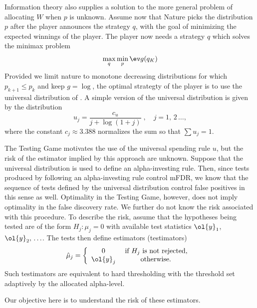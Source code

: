 \documentclass[12pt]{article}
\begin{document}
 Information theory also supplies a solution to the more general problem of
 allocating $W$ when $p$ is unknown.  Assume now that Nature picks the
 distribution $p$ after the player announces the strategy $q$, with the goal of
 minimizing the expected winnings of the player.  The player now needs a
 strategy $q$ which solves the minimax problem
 \begin{equation}
   \max_q \min_p \ev g(q_K)   
 \label{eq:qopt}
 \end{equation}
 Provided we limit nature to monotone decreasing distributions for which
 $p_{k+1} \le p_k$ and keep $g = \log$, the optimal strategty of the player is
 to use the universal distribution of \citet{elias75, rissanen83}.  A simple
 version of the universal distribution is given by the distribution
 \begin{equation}
   u_j = \frac{c_u}{j + \log (1+j)} \;, \quad j = 1,\,2\, \ldots,
 \label{eq:univ}
 \end{equation}
 where the constant $c_j \approx 3.388$ normalizes the sum so that $\sum u_j = 1$.


 The Testing Game motivates the use of the universal spending rule $u$, but the
 risk of the estimator implied by this approach are unknown.  Suppose that the
 universal distribution is used to define an alpha-investing rule.  Then, since
 tests produced by following an alpha-investing rule control mFDR, we know that
 the sequence of tests defined by the universal distribution control false
 positives in this sense as well.  Optimality in the Testing Game, however, does
 not imply optimality in the false discovery rate.  We further do not know the
 risk associated with this procedure.  To describe the risk, assume that the
 hypotheses being tested are of the form $H_j: \mu_j = 0$ with available test
 statistics $\ol{y}_1$, $\ol{y}_2, \,\ldots$.  The tests then define estimators
 (testimators)
 \begin{equation}
    \hat\mu_j = \left\{ 
       \begin{array}{cc}
           0         & \mbox { if $H_j$ is not rejected, }    \cr
           \ol{y}_j  & \mbox { otherwise. } 
       \end{array}  \right.
 \label{eq:muhat}
 \end{equation}
 Such testimators are equivalent to hard thresholding with the threshold set
 adaptively by the allocated alpha-level.

 
 Our objective here is to understand the risk of these estimators.
\end{document}
